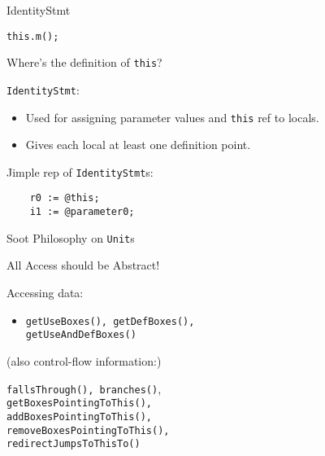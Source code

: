\begin{slide}{IdentityStmt}
\begin{center}
{\tt this.m(); }
\end{center}

Where's the definition of {\tt this}?

\quad
\vspace*{-0.08in}

{\tt IdentityStmt}:
\begin{itemize}
\item Used for assigning parameter values and {\tt this} ref to locals.

\item Gives each local at least one definition point.
\end{itemize}

\vspace*{0.03in}
Jimple rep of {\tt IdentityStmt}s:
\begin{verbatim}
    r0 := @this;
    i1 := @parameter0;
\end{verbatim}
\end{slide}

\begin{slide}{Soot Philosophy on {\tt Unit}s}
\vspace*{-0.1in}
\begin{center}
All Access should be Abstract!
\end{center}

\vspace*{0.05in}
Accessing data:
\begin{itemize}
\item {\tt \red getUseBoxes(), getDefBoxes(),\\
\qquad \qquad  getUseAndDefBoxes()}
\end{itemize}

{\small 
(also control-flow information:)\\
\qquad \begin{minipage}{0.8\textwidth}
{\tt fallsThrough(), branches()},\\
{\tt getBoxesPointingToThis(), \\
 addBoxesPointingToThis(), \\
 removeBoxesPointingToThis(),}\\
{\tt redirectJumpsToThisTo()}
\end{minipage}}
\end{slide}

